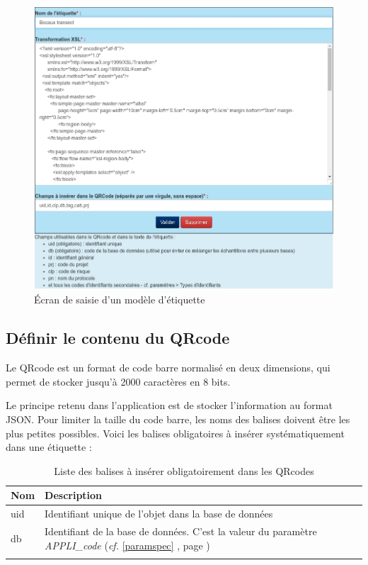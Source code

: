 \begin{figure}[H]
\includegraphics[width=\linewidth]{images/label}
\caption{Écran de saisie d'un modèle d'étiquette}
\end{figure}

\subsection{Définir le contenu du QRcode}
Le QRcode est un format de code barre normalisé en deux dimensions, qui permet de stocker jusqu'à 2000 caractères en 8 bits. 

Le principe retenu dans l'application est de stocker l'information au format JSON. Pour limiter la taille du code barre, les noms des balises doivent être les plus petites possibles. Voici les balises obligatoires à insérer systématiquement dans une étiquette :

\begin{longtable}{|p{3cm}|p{12cm}| }
\hline
\textbf{Nom} & \textbf{Description} \\
\hline
\endhead
uid & Identifiant unique de l'objet dans la base de données \\
\hline
db & Identifiant de la base de données. C'est la valeur du paramètre \textit{APPLI\_code} (\textit{cf.} \ref{paramspec} \textit{\nameref{paramspec}}, page \pageref{paramspec}) \\
\hline
\caption{Liste des balises à insérer obligatoirement dans les QRcodes}
\end{longtable}

